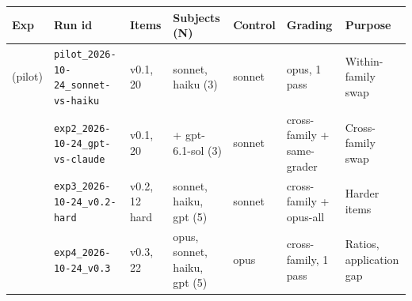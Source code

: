\documentclass[10pt]{article}
\begin{document}
{\def\LTcaptype{none} %
\begin{longtable}[]{@{}
  >{\raggedright\arraybackslash}p{}
  >{\raggedright\arraybackslash}p{}
  >{\raggedright\arraybackslash}p{}
  >{\raggedright\arraybackslash}p{}
  >{\raggedright\arraybackslash}p{}
  >{\raggedright\arraybackslash}p{}
  >{\raggedright\arraybackslash}p{}@{}}
\toprule\noalign{}
\begin{minipage}[b]{\linewidth}\raggedright
Exp
\end{minipage} & \begin{minipage}[b]{\linewidth}\raggedright
Run id
\end{minipage} & \begin{minipage}[b]{\linewidth}\raggedright
Items
\end{minipage} & \begin{minipage}[b]{\linewidth}\raggedright
Subjects (N)
\end{minipage} & \begin{minipage}[b]{\linewidth}\raggedright
Control
\end{minipage} & \begin{minipage}[b]{\linewidth}\raggedright
Grading
\end{minipage} & \begin{minipage}[b]{\linewidth}\raggedright
Purpose
\end{minipage} \\
\midrule\noalign{}
\endhead
\bottomrule\noalign{}
\endlastfoot
1 (pilot) & \texttt{pilot\_\allowbreak{}2026-\allowbreak{}10-\allowbreak{}24\_\allowbreak{}sonnet-\allowbreak{}vs-\allowbreak{}haiku} & v0.1, 20 & sonnet, haiku (3) & sonnet & opus, 1 pass & Within-family swap \\
2 & \texttt{exp2\_\allowbreak{}2026-\allowbreak{}10-\allowbreak{}24\_\allowbreak{}gpt-\allowbreak{}vs-\allowbreak{}claude} & v0.1, 20 & + gpt-6.1-sol (3) & sonnet & cross-family + same-grader & Cross-family swap \\
3 & \texttt{exp3\_\allowbreak{}2026-\allowbreak{}10-\allowbreak{}24\_\allowbreak{}v0.\allowbreak{}2-\allowbreak{}hard} & v0.2, 12 hard & sonnet, haiku, gpt (5) & sonnet & cross-family + opus-all & Harder items \\
4 & \texttt{exp4\_\allowbreak{}2026-\allowbreak{}10-\allowbreak{}24\_\allowbreak{}v0.\allowbreak{}3} & v0.3, 22 & opus, sonnet, haiku, gpt (5) & opus & cross-family, 1 pass & Ratios, application gap \\

\end{longtable}}
\end{document}
